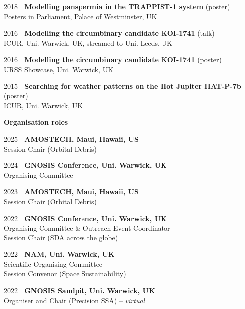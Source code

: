 \documentclass[10pt,a4paper]{altacv}
\begin{document}
\smallskip

\small 2018 | \textbf{Modelling panspermia in the TRAPPIST-1 system} (poster) \\
Posters in Parliament, Palace of Westminster, UK

\smallskip

\small 2016 | \textbf{Modelling the circumbinary candidate KOI-1741} (talk) \\
ICUR, Uni. Warwick, UK, streamed to Uni. Leeds, UK

\smallskip

\small 2016 | \textbf{Modelling the circumbinary candidate KOI-1741} (poster) \\
URSS Showcase, Uni. Warwick, UK

\smallskip

\small 2015 | \textbf{Searching for weather patterns on the Hot Jupiter HAT-P-7b} (poster) \\
ICUR, Uni. Warwick, UK

\divider

\normalsize \textbf{Organisation roles}

\medskip

\small 2025 | \textbf{AMOSTECH, Maui, Hawaii, US} \\
Session Chair (Orbital Debris)

\smallskip

\small 2024 | \textbf{GNOSIS Conference, Uni. Warwick, UK} \\
Organising Committee

\smallskip

\small 2023 | \textbf{AMOSTECH, Maui, Hawaii, US} \\
Session Chair (Orbital Debris)

\smallskip

\small 2022 | \textbf{GNOSIS Conference, Uni. Warwick, UK} \\
Organising Committee \& Outreach Event Coordinator \\
Session Chair (SDA across the globe)

\smallskip

\small 2022 | \textbf{NAM, Uni. Warwick, UK} \\
Scientific Organising Committee \\
Session Convenor (Space Sustainability)

\smallskip

\small 2022 | \textbf{GNOSIS Sandpit, Uni. Warwick, UK} \\
Organiser and Chair (Precision SSA) -- \textit{virtual}
\end{document}
